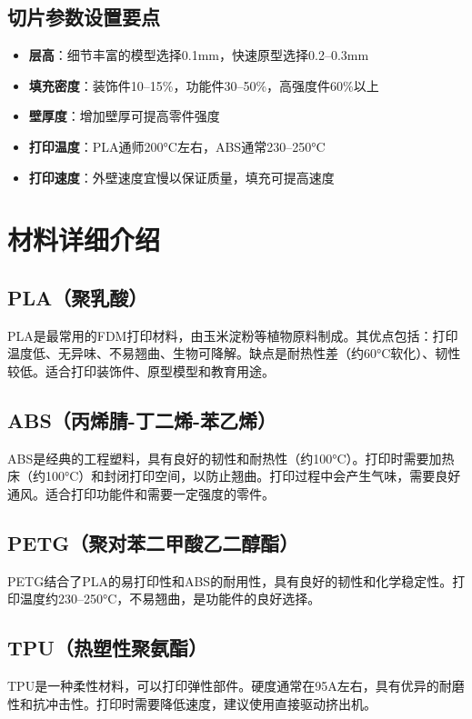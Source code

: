 \documentclass[12pt,UTF8]{ctexbook}
\begin{document}
\subsection{切片参数设置要点}
\begin{itemize}
\item \textbf{层高}：细节丰富的模型选择0.1mm，快速原型选择0.2--0.3mm
\item \textbf{填充密度}：装饰件10--15\%，功能件30--50\%，高强度件60\%以上
\item \textbf{壁厚度}：增加壁厚可提高零件强度
\item \textbf{打印温度}：PLA通师200°C左右，ABS通常230--250°C
\item \textbf{打印速度}：外壁速度宜慢以保证质量，填充可提高速度
\end{itemize}

\section{材料详细介绍}

\subsection{PLA（聚乳酸）}
PLA是最常用的FDM打印材料，由玉米淀粉等植物原料制成。其优点包括：打印温度低、无异味、不易翘曲、生物可降解。缺点是耐热性差（约60°C软化）、韧性较低。适合打印装饰件、原型模型和教育用途。

\subsection{ABS（丙烯腈-丁二烯-苯乙烯）}
ABS是经典的工程塑料，具有良好的韧性和耐热性（约100°C）。打印时需要加热床（约100°C）和封闭打印空间，以防止翘曲。打印过程中会产生气味，需要良好通风。适合打印功能件和需要一定强度的零件。

\subsection{PETG（聚对苯二甲酸乙二醇酯）}
PETG结合了PLA的易打印性和ABS的耐用性，具有良好的韧性和化学稳定性。打印温度约230--250°C，不易翘曲，是功能件的良好选择。

\subsection{TPU（热塑性聚氨酯）}
TPU是一种柔性材料，可以打印弹性部件。硬度通常在95A左右，具有优异的耐磨性和抗冲击性。打印时需要降低速度，建议使用直接驱动挤出机。
\end{document}
